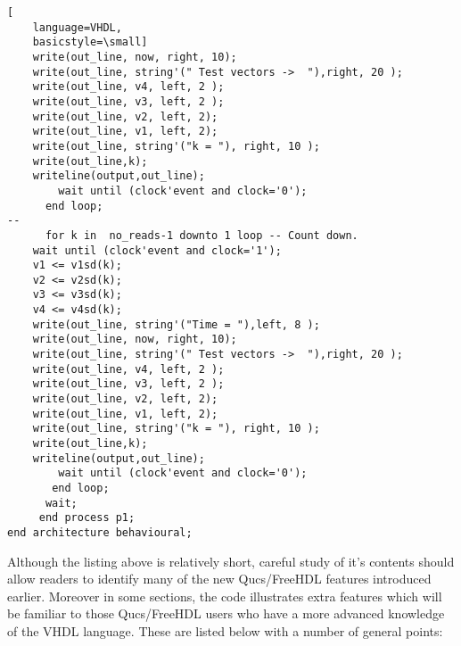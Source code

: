 \begin{lstlisting}[
    language=VHDL,
    basicstyle=\small]
	write(out_line, now, right, 10);
	write(out_line, string'(" Test vectors ->  "),right, 20 );
	write(out_line, v4, left, 2 ); 
	write(out_line, v3, left, 2 ); 
	write(out_line, v2, left, 2); 
	write(out_line, v1, left, 2); 
	write(out_line, string'("k = "), right, 10 );
	write(out_line,k);
	writeline(output,out_line);	
        wait until (clock'event and clock='0');
      end loop; 
--
      for k in  no_reads-1 downto 1 loop -- Count down.
	wait until (clock'event and clock='1');
	v1 <= v1sd(k);
	v2 <= v2sd(k);
	v3 <= v3sd(k);
	v4 <= v4sd(k);	
	write(out_line, string'("Time = "),left, 8 );
	write(out_line, now, right, 10);
	write(out_line, string'(" Test vectors ->  "),right, 20 );
	write(out_line, v4, left, 2 ); 
	write(out_line, v3, left, 2 ); 
	write(out_line, v2, left, 2); 
	write(out_line, v1, left, 2); 
	write(out_line, string'("k = "), right, 10 );
	write(out_line,k);
	writeline(output,out_line);	
        wait until (clock'event and clock='0');
       end loop; 
      wait;
     end process p1;
end architecture behavioural;
\end{lstlisting} 
\FloatBarrier

Although the listing above is relatively short, careful study of it's contents should allow readers to identify many of the new Qucs/FreeHDL features introduced earlier.  Moreover in some sections, the code illustrates extra features which will be familiar to those Qucs/FreeHDL users who have a more advanced knowledge of the VHDL language.  These are listed below with a number of general points:

